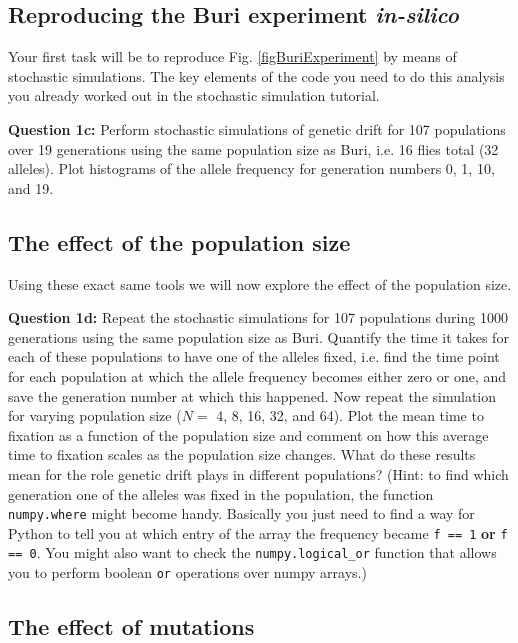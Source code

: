 \documentclass[12pt]{article}    %
\begin{document}
\subsection{Reproducing the Buri experiment \textit{in-silico}}
Your first task will be to reproduce Fig. \ref{figBuriExperiment} by means of
stochastic simulations. The key elements of the code you need to
do this analysis you already worked out in the stochastic
simulation tutorial.

\vspace{5mm}
\textbf{Question 1c:} Perform stochastic simulations of genetic drift for 107
populations over 19 generations using the same population size as Buri, i.e.
16 flies total (32 alleles). Plot histograms of the allele frequency for
generation numbers 0, 1, 10, and 19.
\vspace{5mm}

\subsection{The effect of the population size}
 Using these exact same tools we will now explore the effect
 of the population size.

\vspace{5mm}
\textbf{Question 1d:} Repeat the stochastic simulations for 107 populations
during 1000 generations using the same population size as Buri. Quantify the
time it takes for each of these populations to have one of the alleles fixed,
i.e. find the time point for each population at which the allele frequency
becomes either zero or one, and save the generation number at which this
happened. Now repeat the simulation for varying population size ($ N = $ 4, 8,
16, 32, and 64). Plot the mean time to fixation as a function of the population
size and comment on how this average time to fixation scales as the population
size changes. What do these results mean for the role genetic drift
plays in different populations? (Hint: to find which generation one of the
alleles was fixed in the population, the function \texttt{numpy.where} might
become handy. Basically you just need to find a way for Python to tell you at
which entry of the array the frequency became \texttt{f == 1} \textbf{or}
\texttt{f == 0}. You might also want to check the \texttt{numpy.logical\_or}
function that allows you to perform boolean \texttt{or} operations over numpy
arrays.)
\vspace{5mm}

\subsection{The effect of mutations}
\end{document}
